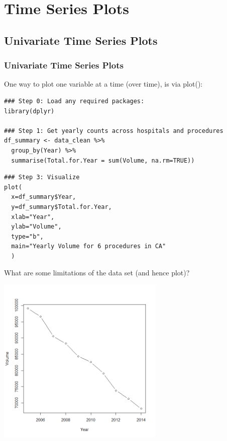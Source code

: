 




\section[Time Series Plots]{Time Series Plots}

\subsection{Univariate Time Series Plots}

\begin{frame}
\frametitle{Univariate Time Series Plots}

One way to plot one variable at a time (over time), is via \ttfamily plot(): \normalfont 
		\begin{lstlisting}
### Step 0: Load any required packages:
library(dplyr)

### Step 1: Get yearly counts across hospitals and procedures
df_summary <- data_clean %>%
  group_by(Year) %>%
  summarise(Total.for.Year = sum(Volume, na.rm=TRUE))
  \end{lstlisting}

\newpage
  \begin{lstlisting}
### Step 3: Visualize
plot(
  x=df_summary$Year,
  y=df_summary$Total.for.Year,
  xlab="Year",
  ylab="Volume",
  type="b",
  main="Yearly Volume for 6 procedures in CA"
  )
		\end{lstlisting}
What are some limitations of the data set (and hence plot)?

\newpage
      \begin{center}
        \includegraphics[width=0.6\textwidth]{images/univar_ts.png}
       \end{center}

\end{frame}

